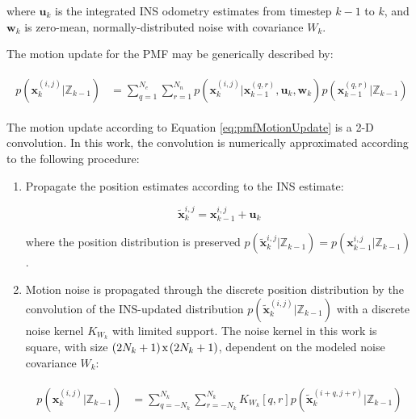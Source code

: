 \noindent where $\mathbf{u}_k$ is the integrated INS odometry estimates from timestep $k-1$ to $k$, and $\mathbf{w}_k$ is zero-mean, normally-distributed noise with covariance $W_k$.

The motion update for the PMF may be generically described by:

\begin{align}
\begin{split}
p(\mathbf{x}_k^{(i,j)}|\mathbb{Z}_{k-1}) &= \sum_{q=1}^{N_e} \sum_{r=1}^{N_n} p(\mathbf{x}_k^{(i,j)} | \mathbf{x}_{k-1}^{(q,r)}, \mathbf{u}_k, \mathbf{w}_k) p(\mathbf{x}_{k-1}^{(q,r)}|\mathbb{Z}_{k-1})
\end{split}
\label{eq:pmfMotionUpdate}
\end{align}

The motion update according to Equation \ref{eq:pmfMotionUpdate} is a 2-D convolution.  In this work, the convolution is numerically approximated according to the following procedure:

\begin{enumerate}
\item Propagate the position estimates according to the INS estimate: 

\begin{equation}
\tilde{\mathbf{x}}_k^{i,j} = \mathbf{x}_{k-1}^{i,j} + \mathbf{u}_k
\end{equation}

\noindent where the position distribution is preserved $p(\tilde{\mathbf{x}}_k^{i,j} | \mathbb{Z}_{k-1}) = p(\mathbf{x}_{k-1}^{i,j} | \mathbb{Z}_{k-1})$.

\item Motion noise is propagated through the discrete position distribution by the convolution of the INS-updated distribution $p(\tilde{\mathbf{x}}_k ^{(i,j)}| \mathbb{Z}_{k-1})$ with a discrete noise kernel $K_{W_k}$ with limited support.  The noise kernel in this work is square, with size $(2N_k + 1) \hspace{0.3ex} \text{x} \hspace{0.3ex} (2N_k + 1)$, dependent on the modeled noise covariance $W_k$:

\begin{align}
\begin{split}
p(\mathbf{x}_k^{(i,j)} | \mathbb{Z}_{k-1}) &= \sum_{q=-N_k}^{N_k} \sum_{r=-N_k}^{N_k}  K_{W_k}[q,r] p(\tilde{\mathbf{x}}_k^{(i+q, j+r)} | \mathbb{Z}_{k-1}) \\
\end{split}
\label{eq:pmfTimeUpdate}
\end{align}

\end{enumerate}

